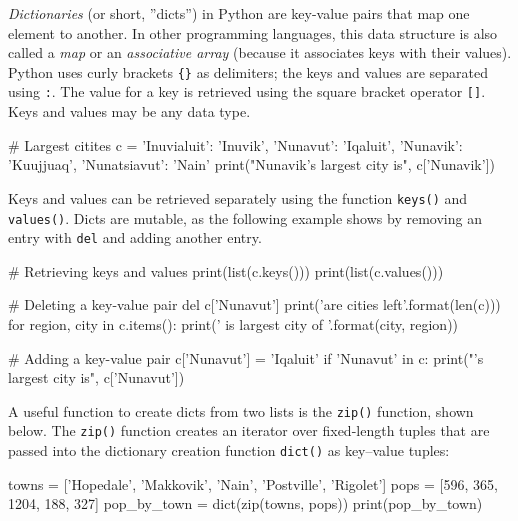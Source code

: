 \emph{Dictionaries} (or short, ''dicts'') in Python are key-value pairs that map one element to another. In other programming languages, this data structure is also called a \emph{map} or an \emph{associative array} (because it associates keys with their values). Python uses curly brackets \texttt{\{\}} as delimiters; the keys and values are separated using \texttt{:}. The value for a key is retrieved using the square bracket operator \texttt{[]}. Keys and values may be any data type.

\begin{samepage}
\begin{pythoncode}
# Largest citites
c = {
    'Inuvialuit': 'Inuvik',
    'Nunavut': 'Iqaluit',
    'Nunavik': 'Kuujjuaq',
    'Nunatsiavut': 'Nain' 
}
print("Nunavik's largest city is", c['Nunavik'])
\end{pythoncode}
\end{samepage}

Keys and values can be retrieved separately using the function \texttt{keys()} and \texttt{values()}. Dicts are mutable, as the following example shows by removing an entry with \texttt{del} and adding another entry.

\begin{samepage}
\begin{pythoncode}
# Retrieving keys and values
print(list(c.keys()))
print(list(c.values()))

# Deleting a key-value pair
del c['Nunavut']
print('\nThere are {} cities left\n'.format(len(c)))
for region, city in c.items():
    print('{} is largest city of {}'.format(city, region))

# Adding a key-value pair
c['Nunavut'] = 'Iqaluit'
if 'Nunavut' in c:
    print("\nNunavut's largest city is", c['Nunavut'])
\end{pythoncode}
\end{samepage}

A useful function to create dicts from two lists is the \texttt{zip()} function, shown below. The \texttt{zip()} function creates an iterator over fixed-length tuples that are passed into the dictionary creation function \texttt{dict()} as key--value tuples:

\begin{samepage}
\begin{pythoncode}
towns = ['Hopedale', 'Makkovik', 'Nain', 'Postville', 'Rigolet']
pops = [596, 365, 1204, 188, 327]
pop_by_town = dict(zip(towns, pops))
print(pop_by_town)
\end{pythoncode}
\end{samepage}

